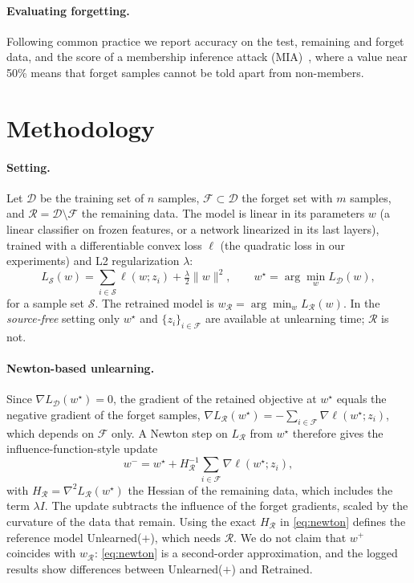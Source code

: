 \documentclass[10pt,twocolumn,letterpaper]{article}
\begin{document}
\paragraph{Evaluating forgetting.}
Following common practice we report accuracy on the test, remaining and forget data, and the score of a membership inference attack (MIA)~\cite{shokri2017membership}, where a value near 50\% means that forget samples cannot be told apart from non-members.

\section{Methodology}
\label{sec:method}
\paragraph{Setting.}
Let $\mathcal{D}$ be the training set of $n$ samples, $\mathcal{F}\subset\mathcal{D}$ the forget set with $m$ samples, and $\mathcal{R}=\mathcal{D}\setminus\mathcal{F}$ the remaining data.
The model is linear in its parameters $w$ (a linear classifier on frozen features, or a network linearized in its last layers), trained with a differentiable convex loss $\ell$ (the quadratic loss in our experiments) and L2 regularization $\lambda$:
\begin{equation}
  L_{\mathcal{S}}(w) = \sum_{i\in\mathcal{S}} \ell(w; z_i) + \tfrac{\lambda}{2}\lVert w\rVert^2, \qquad w^\star = \arg\min_w L_{\mathcal{D}}(w),
  \label{eq:objective}
\end{equation}
for a sample set $\mathcal{S}$.
The retrained model is $w_{\mathcal{R}}=\arg\min_w L_{\mathcal{R}}(w)$. In the \emph{source-free} setting only $w^\star$ and $\{z_i\}_{i\in\mathcal{F}}$ are available at unlearning time; $\mathcal{R}$ is not.

\paragraph{Newton-based unlearning.}
Since $\nabla L_{\mathcal{D}}(w^\star)=0$, the gradient of the retained objective at $w^\star$ equals the negative gradient of the forget samples, $\nabla L_{\mathcal{R}}(w^\star) = -\sum_{i\in\mathcal{F}}\nabla\ell(w^\star;z_i)$, which depends on $\mathcal{F}$ only.
A Newton step on $L_{\mathcal{R}}$ from $w^\star$ therefore gives the influence-function-style update~\cite{koh2017understanding,guo2020certified}
\begin{equation}
  w^{-} = w^\star + H_{\mathcal{R}}^{-1}\sum_{i\in\mathcal{F}}\nabla\ell(w^\star; z_i),
  \label{eq:newton}
\end{equation}
with $H_{\mathcal{R}}=\nabla^2 L_{\mathcal{R}}(w^\star)$ the Hessian of the remaining data, which includes the term $\lambda I$.
The update subtracts the influence of the forget gradients, scaled by the curvature of the data that remain.
Using the exact $H_{\mathcal{R}}$ in \cref{eq:newton} defines the reference model Unlearned($+$), which needs $\mathcal{R}$.
We do not claim that $w^{+}$ coincides with $w_{\mathcal{R}}$: \cref{eq:newton} is a second-order approximation, and the logged results show differences between Unlearned($+$) and Retrained.
\end{document}
